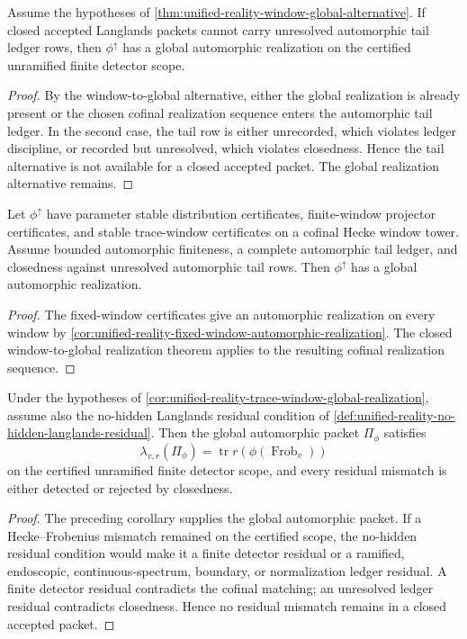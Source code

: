 \begin{theorem}
\label{thm:unified-reality-closed-window-global-realization}
Assume the hypotheses of
\autoref{thm:unified-reality-window-global-alternative}. If closed
accepted Langlands packets cannot carry unresolved automorphic tail
ledger rows, then $\phi^{\uparrow}$ has a global automorphic realization
on the certified unramified finite detector scope.
\end{theorem}
\begin{proof}
By the window-to-global alternative, either the global realization is
already present or the chosen cofinal realization sequence enters the
automorphic tail ledger. In the second case, the tail row is either
unrecorded, which violates ledger discipline, or recorded but
unresolved, which violates closedness. Hence the tail alternative is
not available for a closed accepted packet. The global realization
alternative remains.
\end{proof}

\begin{corollary}
\label{cor:unified-reality-trace-window-global-realization}
Let $\phi^{\uparrow}$ have parameter stable distribution certificates,
finite-window projector certificates, and stable trace-window
certificates on a cofinal Hecke window tower. Assume bounded automorphic
finiteness, a complete automorphic tail ledger, and closedness against
unresolved automorphic tail rows. Then $\phi^{\uparrow}$ has a global
automorphic realization.
\end{corollary}
\begin{proof}
The fixed-window certificates give an automorphic realization on every
window by
\autoref{cor:unified-reality-fixed-window-automorphic-realization}. The
closed window-to-global realization theorem applies to the resulting
cofinal realization sequence.
\end{proof}

\begin{corollary}
\label{cor:unified-reality-window-global-reciprocity}
Under the hypotheses of
\autoref{cor:unified-reality-trace-window-global-realization}, assume
also the no-hidden Langlands residual condition of
\autoref{def:unified-reality-no-hidden-langlands-residual}. Then the
global automorphic packet $\Pi_{\phi}$ satisfies
$$
\lambda_{v,r}(\Pi_{\phi})
=
\operatorname{tr}r(\phi(\operatorname{Frob}_v))
$$
on the certified unramified finite detector scope, and every residual
mismatch is either detected or rejected by closedness.
\end{corollary}
\begin{proof}
The preceding corollary supplies the global automorphic packet. If a
Hecke--Frobenius mismatch remained on the certified scope, the
no-hidden residual condition would make it a finite detector residual or
a ramified, endoscopic, continuous-spectrum, boundary, or normalization
ledger residual. A finite detector residual contradicts the cofinal
matching; an unresolved ledger residual contradicts closedness. Hence no
residual mismatch remains in a closed accepted packet.
\end{proof}

